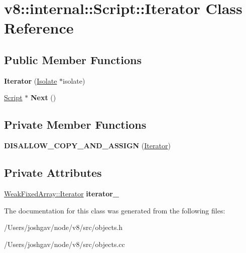 \hypertarget{classv8_1_1internal_1_1_script_1_1_iterator}{}\section{v8\+:\+:internal\+:\+:Script\+:\+:Iterator Class Reference}
\label{classv8_1_1internal_1_1_script_1_1_iterator}
\subsection*{Public Member Functions}
\begin{DoxyCompactItemize}
\item 
{\bfseries Iterator} (\hyperlink{classv8_1_1internal_1_1_isolate}{Isolate} $\ast$isolate)\hypertarget{classv8_1_1internal_1_1_script_1_1_iterator_a90c37085f529d94ebc8d8d045ffd0fed}{}\label{classv8_1_1internal_1_1_script_1_1_iterator_a90c37085f529d94ebc8d8d045ffd0fed}

\item 
\hyperlink{classv8_1_1internal_1_1_script}{Script} $\ast$ {\bfseries Next} ()\hypertarget{classv8_1_1internal_1_1_script_1_1_iterator_a190ccddbb2dad8395191c3254b993a7b}{}\label{classv8_1_1internal_1_1_script_1_1_iterator_a190ccddbb2dad8395191c3254b993a7b}

\end{DoxyCompactItemize}
\subsection*{Private Member Functions}
\begin{DoxyCompactItemize}
\item 
{\bfseries D\+I\+S\+A\+L\+L\+O\+W\+\_\+\+C\+O\+P\+Y\+\_\+\+A\+N\+D\+\_\+\+A\+S\+S\+I\+GN} (\hyperlink{classv8_1_1internal_1_1_script_1_1_iterator}{Iterator})\hypertarget{classv8_1_1internal_1_1_script_1_1_iterator_aedf325d182949069812848ed8608f4d2}{}\label{classv8_1_1internal_1_1_script_1_1_iterator_aedf325d182949069812848ed8608f4d2}

\end{DoxyCompactItemize}
\subsection*{Private Attributes}
\begin{DoxyCompactItemize}
\item 
\hyperlink{classv8_1_1internal_1_1_weak_fixed_array_1_1_iterator}{Weak\+Fixed\+Array\+::\+Iterator} {\bfseries iterator\+\_\+}\hypertarget{classv8_1_1internal_1_1_script_1_1_iterator_a5102c05aa35869240caa5bfa7a2d3417}{}\label{classv8_1_1internal_1_1_script_1_1_iterator_a5102c05aa35869240caa5bfa7a2d3417}

\end{DoxyCompactItemize}


The documentation for this class was generated from the following files\+:\begin{DoxyCompactItemize}
\item 
/\+Users/joshgav/node/v8/src/objects.\+h\item 
/\+Users/joshgav/node/v8/src/objects.\+cc\end{DoxyCompactItemize}
